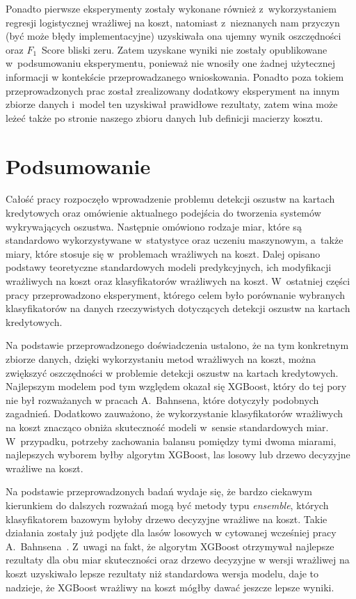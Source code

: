 \documentclass[inzynierska]{pwr_wmat_praca_dyplomowa}
\theoremstyle{plain}
\numberwithin{theorem}{chapter}
\theoremstyle{definition}
\numberwithin{theorem}{chapter}
\begin{document}
Ponadto pierwsze eksperymenty zostały wykonane również z~wykorzystaniem regresji logistycznej wrażliwej na koszt, natomiast z~nieznanych nam przyczyn (być może błędy implementacyjne) uzyskiwała ona ujemny wynik oszczędności oraz $F_1$~Score bliski zeru. Zatem uzyskane wyniki nie zostały opublikowane w~podsumowaniu eksperymentu, ponieważ nie wnosiły one żadnej użytecznej informacji w kontekście przeprowadzanego wnioskowania. Ponadto poza tokiem przeprowadzonych prac został zrealizowany dodatkowy eksperyment na innym zbiorze danych i~model ten uzyskiwał prawidłowe rezultaty, zatem wina może leżeć także po stronie naszego zbioru danych lub definicji macierzy kosztu.

\chapter*{Podsumowanie}
 
Całość pracy rozpoczęło wprowadzenie problemu detekcji oszustw na kartach kredytowych oraz omówienie aktualnego podejścia do tworzenia systemów wykrywających oszustwa. Następnie omówiono rodzaje miar, które są standardowo wykorzystywane w~statystyce oraz uczeniu maszynowym, a~także miary, które stosuje się w~problemach wrażliwych na koszt. Dalej opisano podstawy teoretyczne standardowych modeli predykcyjnych, ich modyfikacji wrażliwych na koszt oraz klasyfikatorów wrażliwych na koszt. W~ostatniej części pracy przeprowadzono eksperyment, którego celem było porównanie wybranych klasyfikatorów na danych rzeczywistych dotyczących detekcji oszustw na kartach kredytowych.

Na podstawie przeprowadzonego doświadczenia ustalono, że na tym konkretnym zbiorze danych, dzięki wykorzystaniu metod wrażliwych na koszt, można zwiększyć oszczędności w problemie detekcji oszustw na kartach kredytowych. Najlepszym modelem pod tym względem okazał się XGBoost, który do tej pory nie był rozważanych w pracach A.~Bahnsena, które dotyczyły podobnych zagadnień. Dodatkowo zauważono, że wykorzystanie klasyfikatorów wrażliwych na koszt znacząco obniża skuteczność modeli w~sensie standardowych miar. W~przypadku, potrzeby zachowania balansu pomiędzy tymi dwoma miarami, najlepszych wyborem byłby algorytm XGBoost, las losowy lub drzewo decyzyjne wrażliwe na koszt.

Na podstawie przeprowadzonych badań wydaje się, że bardzo ciekawym kierunkiem do dalszych rozważań mogą być metody typu \textit{ensemble}, których klasyfikatorem bazowym byłoby drzewo decyzyjne wrażliwe na koszt. Takie działania zostały już podjęte dla lasów losowych w cytowanej wcześniej pracy A.~Bahnsena~\cite{alej2015ensemble}. Z~uwagi na fakt, że algorytm XGBoost otrzymywał najlepsze rezultaty dla obu miar skuteczności oraz drzewo decyzyjne w wersji wrażliwej na koszt uzyskiwało lepsze rezultaty niż standardowa wersja modelu, daje to nadzieje, że XGBoost wrażliwy na koszt mógłby dawać jeszcze lepsze wyniki.
\end{document}
